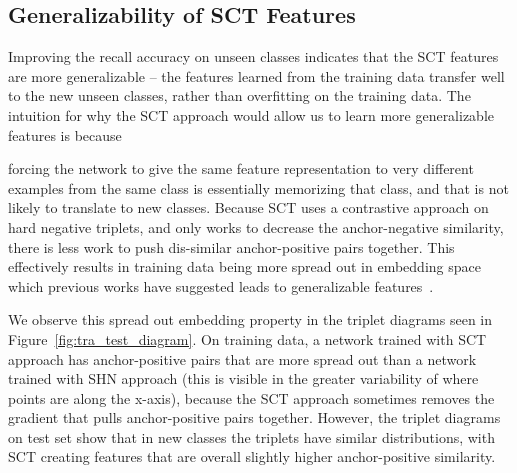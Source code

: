 \documentclass[runningheads]{llncs}
\begin{document}
\begin{table}[t]
\begin{center}
\end{center}
\caption{Retrieval performance on the Hotels-50K dataset. All methods are trained with Resnet-50 and embedding size is 256.}
\label{table:Hotels}
\end{table} 
\subsection{Generalizability of SCT Features}
Improving the recall accuracy on unseen classes indicates that the SCT features are more generalizable -- the features learned from the training data transfer well to the new unseen classes, rather than overfitting on the training data. The intuition for why the SCT approach would allow us to learn more generalizable features is because 

forcing the network to give the same feature representation to very different examples from the same class is essentially memorizing that class, and that is not likely to translate to new classes.  Because SCT uses a contrastive approach on hard negative triplets, and only works to decrease the anchor-negative similarity, there is less work to push dis-similar anchor-positive pairs together.  This effectively results in training data being more spread out in embedding space which previous works have suggested leads to generalizable features~\cite{Wu_2018_CVPR,xuan2019improved}.

We observe this spread out embedding property in the triplet diagrams seen in Figure~\ref{fig:tra_test_diagram}. On training data, a network trained with SCT approach has anchor-positive pairs that are more spread out than a network trained with SHN approach (this is visible in the greater variability of where points are along the x-axis), because the SCT approach sometimes removes the gradient that pulls anchor-positive pairs together.  However, the triplet diagrams on test set show that in new classes the triplets have similar distributions, with SCT creating features that are overall slightly higher anchor-positive similarity.
\end{document}
